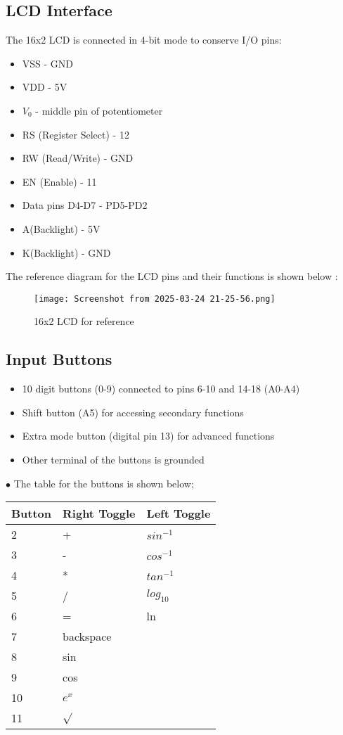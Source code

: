 \documentclass{article}
\begin{document}
\subsection{LCD Interface}
The 16x2 LCD is connected in 4-bit mode to conserve I/O pins:
\begin{itemize}
    \item VSS - GND
    \item VDD - 5V
    \item $V_0$ - middle pin of potentiometer 
    \item RS (Register Select) - 12
    \item RW (Read/Write) - GND
    \item EN (Enable) - 11
    \item Data pins D4-D7 - PD5-PD2
    \item A(Backlight) - 5V
    \item K(Backlight) - GND 
\end{itemize}
The reference diagram for the LCD pins and their functions is shown below : \\
\begin{figure}[htbp]
    \centering
    \texttt{[image: Screenshot from 2025-03-24 21-25-56.png]} %
    \caption{16x2 LCD for reference}
    \label{fig:example}
\end{figure}
\subsection{Input Buttons}
\begin{itemize}
    \item 10 digit buttons (0-9) connected to pins 6-10 and 14-18 (A0-A4)
    \item Shift button (A5) for accessing secondary functions
    \item Extra mode button (digital pin 13) for advanced functions
    \item Other terminal of the buttons is grounded
\end{itemize}
$\bullet$ The table for the buttons is shown below; \\
\begin{table}[h]
\centering
\begin{tabular}{|l|l|l|}
\hline
\textbf{Button} & \textbf{Right Toggle} & \textbf{Left Toggle} \\ \hline
     2 &  + & $sin^{-1}$ \\ \hline
     3 &  - & $cos^{-1}$ \\ \hline
     4 &  * & $tan^{-1}$ \\ \hline
     5 &  / & $log_{10}$ \\ \hline
     6 & = & ln \\ \hline
     7 & backspace & \\ \hline
     8 & sin &  \\ \hline
     9 & cos & \\ \hline
     10 & $e^x$ & \\ \hline
     11 & $\sqrt{}$ & \\ \hline 
\end{tabular}
\end{table}
\end{document}
